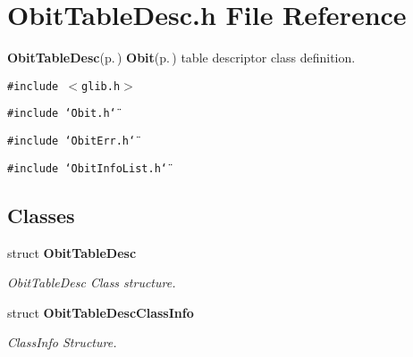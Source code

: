 \section{Obit\-Table\-Desc.h File Reference}
\label{ObitTableDesc_8h}
{\bf Obit\-Table\-Desc}{\rm (p.\,\pageref{structObitTableDesc})} {\bf Obit}{\rm (p.\,\pageref{structObit})} table descriptor class definition. 

{\tt \#include $<$glib.h$>$}\par
{\tt \#include \char`\"{}Obit.h\char`\"{}}\par
{\tt \#include \char`\"{}Obit\-Err.h\char`\"{}}\par
{\tt \#include \char`\"{}Obit\-Info\-List.h\char`\"{}}\par
\subsection*{Classes}
\begin{CompactItemize}
\item 
struct {\bf Obit\-Table\-Desc}
\begin{CompactList}\small\item\em Obit\-Table\-Desc Class structure. \item\end{CompactList}\item 
struct {\bf Obit\-Table\-Desc\-Class\-Info}
\begin{CompactList}\small\item\em Class\-Info Structure. \item\end{CompactList}\end{CompactItemize}
